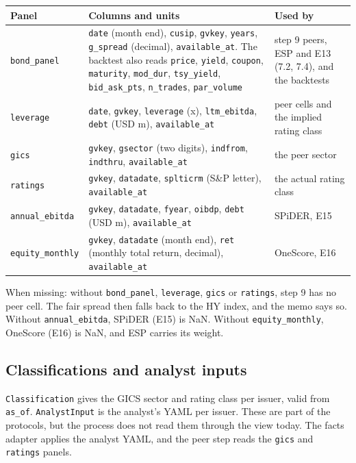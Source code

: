 \documentclass[11pt,a4paper]{article}
\newcommand{\code}[1]{\texttt{\small #1}}
\begin{document}
\medskip
\noindent\begin{tabularx}{\linewidth}{@{}lLp{3.6cm}@{}}
\toprule
Panel & Columns and units & Used by\\\midrule
\code{bond\_panel} & \code{date} (month end), \code{cusip}, \code{gvkey}, \code{years}, \code{g\_spread} (decimal),
\code{available\_at}. The backtest also reads \code{price}, \code{yield}, \code{coupon}, \code{maturity}, \code{mod\_dur},
\code{tsy\_yield}, \code{bid\_ask\_pts}, \code{n\_trades}, \code{par\_volume} & step 9 peers, ESP and E13 (7.2, 7.4), and the
backtests\\
\code{leverage} & \code{date}, \code{gvkey}, \code{leverage} (x), \code{ltm\_ebitda}, \code{debt} (USD m),
\code{available\_at} & peer cells and the implied rating class\\
\code{gics} & \code{gvkey}, \code{gsector} (two digits), \code{indfrom}, \code{indthru}, \code{available\_at} & the peer
sector\\
\code{ratings} & \code{gvkey}, \code{datadate}, \code{splticrm} (S\&P letter), \code{available\_at} & the actual rating
class\\
\code{annual\_ebitda} & \code{gvkey}, \code{datadate}, \code{fyear}, \code{oibdp}, \code{debt} (USD m),
\code{available\_at} & SPiDER, E15\\
\code{equity\_monthly} & \code{gvkey}, \code{datadate} (month end), \code{ret} (monthly total return, decimal),
\code{available\_at} & OneScore, E16\\
\bottomrule
\end{tabularx}

\medskip\noindent When missing: without \code{bond\_panel}, \code{leverage}, \code{gics} or \code{ratings}, step 9 has
no peer cell. The fair spread then falls back to the HY index, and the memo says so. Without \code{annual\_ebitda},
SPiDER (E15) is NaN. Without \code{equity\_monthly}, OneScore (E16) is NaN, and ESP carries its weight.

\subsection{Classifications and analyst inputs}
\noindent \code{Classification} gives the GICS sector and rating class per issuer, valid from \code{as\_of}.
\code{AnalystInput} is the analyst's YAML per issuer. These are part of the protocols, but the process does not read
them through the view today. The facts adapter applies the analyst YAML, and the peer step reads the \code{gics} and
\code{ratings} panels.
\end{document}
